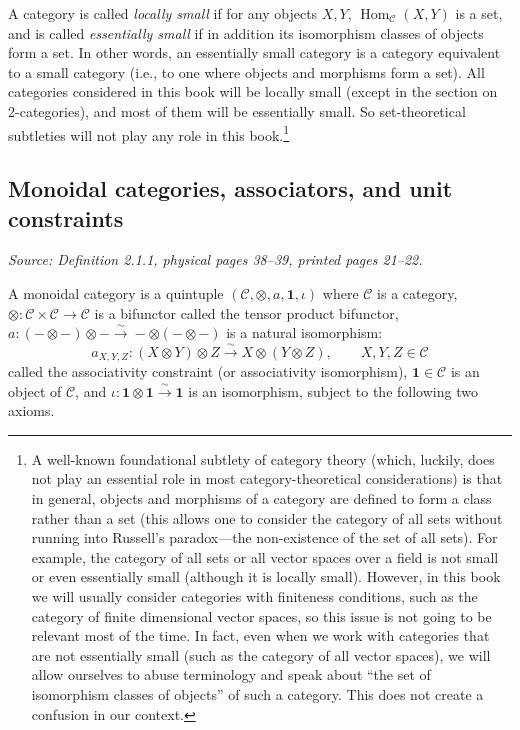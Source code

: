 \documentclass[11pt]{article}
\newcommand{\cC}{\mathcal C}
\newcommand{\one}{\mathbf 1}
\newcommand{\Hom}{\operatorname{Hom}}
\newcommand{\sourceloc}[1]{\par\smallskip\noindent\textit{Source: #1.}\par\nopagebreak[4]\smallskip}
\begin{document}
A category is called \emph{locally small} if for any objects $X,Y$,
$\Hom_{\cC}(X,Y)$ is a set, and is called \emph{essentially small} if in
addition its isomorphism classes of objects form a set. In other words,
an essentially small category is a category equivalent to a small category
(i.e., to one where objects and morphisms form a set). All categories
considered in this book will be locally small (except in the section on
2-categories), and most of them will be essentially small. So set-theoretical
subtleties will not play any role in this book.\footnote[1]{A well-known
foundational subtlety of category theory (which, luckily, does not play an
essential role in most category-theoretical considerations) is that in
general, objects and morphisms of a category are defined to form a class
rather than a set (this allows one to consider the category of all sets
without running into Russell's paradox---the non-existence of the set of
all sets). For example, the category of all sets or all vector spaces over
a field is not small or even essentially small (although it is locally
small). However, in this book we will usually consider categories with
finiteness conditions, such as the category of finite dimensional vector
spaces, so this issue is not going to be relevant most of the time. In fact,
even when we work with categories that are not essentially small (such as
the category of all vector spaces), we will allow ourselves to abuse
terminology and speak about ``the set of isomorphism classes of objects''
of such a category. This does not create a confusion in our context.}

\subsection*{Monoidal categories, associators, and unit constraints}
\sourceloc{Definition 2.1.1, physical pages 38--39, printed pages 21--22}
A monoidal category is a quintuple $(\cC,\otimes,a,\one,\iota)$ where
$\cC$ is a category, $\otimes:\cC\times\cC\to\cC$ is a bifunctor called
the tensor product bifunctor,
$a:(-\otimes-)\otimes-\xrightarrow{\sim}-\otimes(-\otimes-)$ is a natural
isomorphism:
\begin{equation}\tag{2.1}
a_{X,Y,Z}:(X\otimes Y)\otimes Z\xrightarrow{\sim}X\otimes(Y\otimes Z),
\qquad X,Y,Z\in\cC
\end{equation}
called the associativity constraint (or associativity isomorphism),
$\one\in\cC$ is an object of $\cC$, and
$\iota:\one\otimes\one\xrightarrow{\sim}\one$ is an isomorphism,
subject to the following two axioms.
\end{document}

